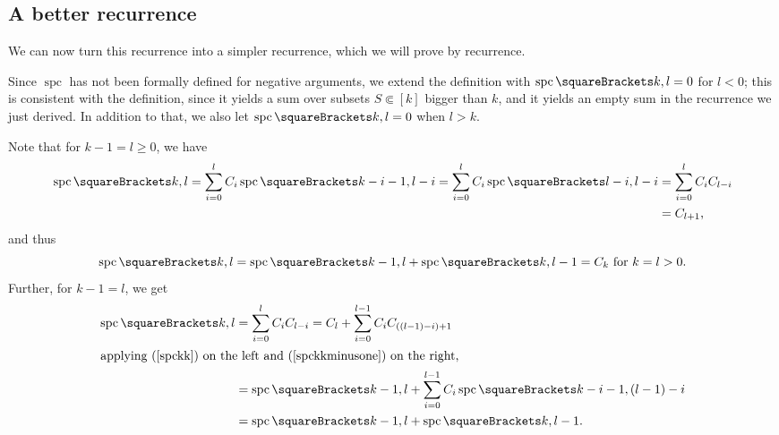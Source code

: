 \documentclass[10pt, a4paper, twoside]{basestyle}
\DeclareMathOperator{\spc}{spc}
\begin{document}
\subsection{A better recurrence}
We can now turn this recurrence into a simpler recurrence, which we will prove by recurrence.

Since $\spc$ has not been formally defined for negative arguments, we extend the definition
with $\spc\of{k,l}=0$ for $l<0$; this is consistent with the definition, since it yields a sum over
subsets $S\Subset [k]$ bigger than $k$, and it yields an empty sum in the recurrence we just derived.
In addition to that, we also let $\spc\of{k,l} = 0$ when $l > k$.

Note that for $k - 1 = l\geq 0$, we have\begin{align}
\spc\of{k, l}
= \sum{i=0}[l]C_{i}\spc\of{k-i-1,l-i} = \sum{i=0}[l]C_{i}\spc\of{l-i,l-i} 
&= \sum{i=0}[l]C_{i}C_{l-i} \nonumber \\
&= C_{l+1}\text,\label{spckkminusone}
\end{align}
and thus 
\begin{equation}
\spc\of{k, l} = \spc\of{k-1, l} + \spc\of{k, l-1} = C_k \text{ for $k = l > 0$.}
\end{equation}
Further, for $k - 1 = l$, we get
\begin{align}
\spc\of{k, l}
&= \sum{i=0}[l]C_{i}C_{l-i} = C_l + \sum{i=0}[l-1]C_{i}C_{((l-1)-i)+1} \nonumber\\
\intertext{applying (\ref{spckk}) on the left and (\ref{spckkminusone}) on the right,}
&= \spc\of{k-1, l} + \sum{i=0}[l-1]C_{i}\spc\of{k-i-1,(l-1)-i} \nonumber\\
&= \spc\of{k-1, l} + \spc\of{k,l-1}\text.
\end{align}
\end{document}
